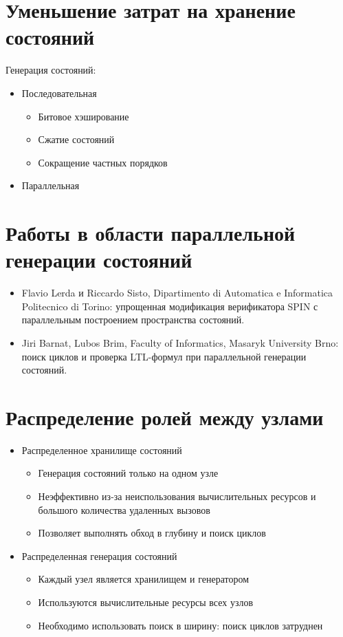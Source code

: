 \documentclass[12pt]{article}
\begin{document}
\section{Уменьшение затрат на хранение состояний}
\label{sec:ram-lightening}

Генерация состояний:

\begin{itemize}
\item Последовательная
  \begin{itemize}
  \item Битовое хэширование
  \item Сжатие состояний
  \item Сокращение частных порядков
  \end{itemize}
\item Параллельная
\end{itemize}

\section{Работы в области параллельной генерации состояний}
\label{sec:analogues}

\begin{itemize}
\item Flavio Lerda и Riccardo Sisto, Dipartimento di Automatica e Informatica Politecnico
  di Torino: упрощенная модификация верификатора SPIN с параллельным построением
  пространства состояний.

\item Jiri Barnat, Lubos Brim, Faculty of Informatics, Masaryk University Brno: поиск
  циклов и проверка LTL-формул при параллельной генерации состояний.
\end{itemize}

\section{Распределение ролей между узлами}
\label{sec:par-gen}

\begin{itemize}
\item Распределенное хранилище состояний
  \begin{itemize}
  \item Генерация состояний только на одном узле
  \item Неэффективно из-за неиспользования вычислительных ресурсов и большого количества
    удаленных вызовов
  \item Позволяет выполнять обход в глубину и поиск циклов
  \end{itemize}

\item Распределенная генерация состояний
  \begin{itemize}
  \item Каждый узел является хранилищем и генератором
  \item Используются вычислительные ресурсы всех узлов
  \item Необходимо использовать поиск в ширину: поиск циклов затруднен
  \end{itemize}

\end{itemize}
\end{document}
